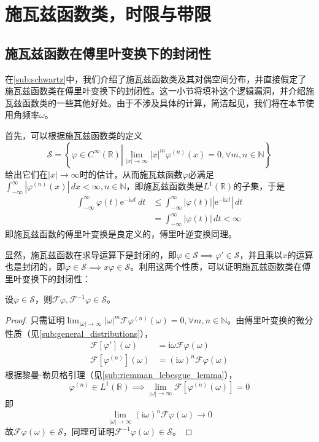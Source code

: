 \section{施瓦兹函数类，时限与带限}\label{sec:Schwartz_Functions}

\subsection{施瓦兹函数在傅里叶变换下的封闭性}\label{sub:fourier_close}
在\ref{sub:schwartz}中，我们介绍了施瓦兹函数类及其对偶空间分布，并直接假定了施瓦兹函数类在傅里叶变换下的封闭性。这一小节将填补这个逻辑漏洞，并介绍施瓦兹函数类的一些其他好处。由于不涉及具体的计算，简洁起见，我们将在本节使用角频率$\omega$。

首先，可以根据施瓦兹函数类的定义\[\mathcal{S} =\left\{\varphi\in C^{\infty}(\mathbb{R} )\left|\lim_{|x|\to\infty}|x|^m\varphi^{(n)}(x)=0,\forall m,n\in\mathbb{N} \right.\right\}\]给出它们在$|x|\to\infty$时的估计，从而施瓦兹函数$\varphi$必满足$\int_{-\infty}^{\infty}|\varphi^{(n)}(x)|\,dx<\infty,n\in\mathbb{N}$，即施瓦兹函数类是$L^1(\mathbb{R} )$的子集，于是\begin{align*}
    \int_{-\infty}^{\infty}\varphi(t)\mathrm{e}^{-\mathrm{i}\omega t}\,dt&\leq \int_{-\infty}^{\infty}|\varphi(t)||\mathrm{e}^{-\mathrm{i}\omega t}|\,dt\\
    &=\int_{-\infty}^{\infty}|\varphi(t)|\,dt<\infty
\end{align*}
即施瓦兹函数的傅里叶变换是良定义的，傅里叶逆变换同理。

显然，施瓦兹函数在求导运算下是封闭的，即$\varphi\in\mathcal{S}\implies \varphi'\in\mathcal{S}$，并且乘以$x$的运算也是封闭的，即$\varphi\in\mathcal{S}\implies x\varphi\in\mathcal{S}$。利用这两个性质，可以证明施瓦兹函数类在傅里叶变换下的封闭性：
\begin{theorem}[施瓦兹函数类在傅里叶变换下的封闭性]
    设$\varphi\in\mathcal{S}$，则$\mathcal{F} \varphi,\mathcal{F} ^{-1} \varphi\in\mathcal{S}$。
\end{theorem}
\begin{proof}
    只需证明$\lim_{|\omega|\to\infty}|\omega|^m \mathcal{F} \varphi^{(n)}(\omega)=0,\forall m,n\in\mathbb{N}$。由傅里叶变换的微分性质（见\ref{sub:general_distributions}），
    \begin{align*}
    \mathcal{F} [\varphi'](\omega)&=\mathrm{i}\omega \mathcal{F} \varphi(\omega)\\
    \mathcal{F} [\varphi^{(n)}](\omega)&=(\mathrm{i}\omega)^n \mathcal{F} \varphi(\omega)
\end{align*}
根据黎曼-勒贝格引理（见\ref{sub:riemman_lebesgue_lemma}），\[\varphi^{(n)}\in L^1(\mathbb{R})\implies\lim_{|\omega|\to\infty}\mathcal{F}\left[ \varphi^{(n)}(\omega)\right]=0\]
即\[\lim_{|\omega|\to\infty}(\mathrm{i}\omega)^n \mathcal{F} \varphi(\omega)\to 0\]
故$\mathcal{F} \varphi(\omega)\in\mathcal{S} $，同理可证明$\mathcal{F}^{-1} \varphi(\omega)\in\mathcal{S} $。
\end{proof}

